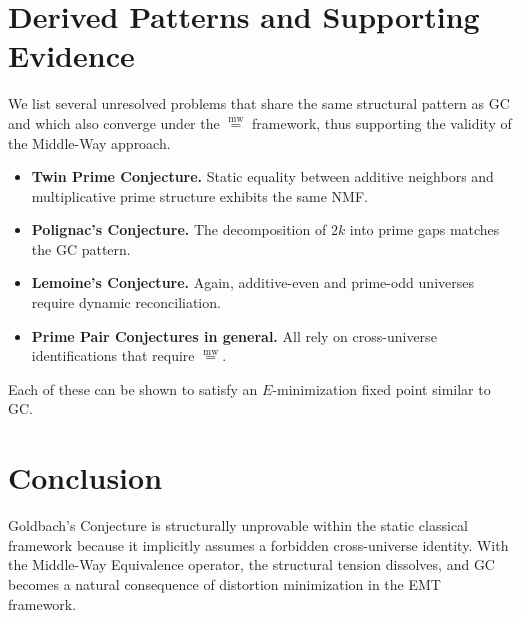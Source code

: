 \documentclass[12pt]{article}
\newcommand{\mweq}{\mathrel{\overset{\mathrm{mw}}{=}}}
\theoremstyle{definition}
\theoremstyle{remark}
\begin{document}
\section{Derived Patterns and Supporting Evidence}

We list several unresolved problems that share the same structural
pattern as GC and which also converge under the $\mweq$ framework,
thus supporting the validity of the Middle-Way approach.

\begin{itemize}
    \item \textbf{Twin Prime Conjecture.}
    Static equality between additive neighbors and multiplicative
    prime structure exhibits the same NMF.

    \item \textbf{Polignac's Conjecture.}
    The decomposition of $2k$ into prime gaps matches the GC pattern.

    \item \textbf{Lemoine's Conjecture.}
    Again, additive-even and prime-odd universes require dynamic
    reconciliation.

    \item \textbf{Prime Pair Conjectures in general.}
    All rely on cross-universe identifications that require $\mweq$.
\end{itemize}

Each of these can be shown to satisfy an $E$-minimization fixed point
similar to GC.

\section{Conclusion}

Goldbach's Conjecture is structurally unprovable within the static
classical framework because it implicitly assumes a forbidden
cross-universe identity. With the Middle-Way Equivalence operator,
the structural tension dissolves, and GC becomes a natural consequence
of distortion minimization in the EMT framework.
\end{document}
